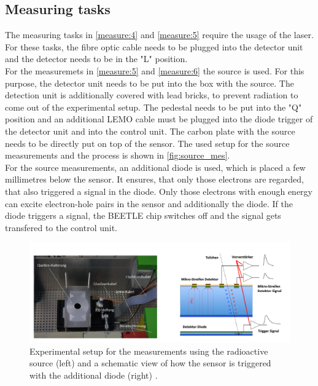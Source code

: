 \subsection{Measuring tasks}

The measuring tasks in \ref{measure:4} and \ref{measure:5} require the usage of the laser. For these tasks, the fibre optic cable
needs to be plugged into the detector unit and the detector needs to be in the "L" position.\\
For the measuremets in \ref{measure:5} and \ref{measure:6} the source is used. For this purpose, the detector unit needs
to be put into the box with the source. The detection unit is additionally covered with lead bricks, to prevent radiation to come 
out of the experimental setup. %
The pedestal needs to be put into the "Q" position and an additional LEMO cable must be plugged into
the diode trigger of the detector unit and into the control unit. The carbon plate with the source needs to be directly put on top
of the sensor. The used setup for the source measurements and the process is shown in \autoref{fig:source_mes}. \\
For the 
source measurements, an additional diode is used, which is placed a few millimetres below the sensor. It ensures, that only
those electrons are regarded, that also triggered a signal in the diode. Only those electrons with enough energy can excite
electron-hole pairs in the sensor and additionally the diode. If the diode triggers a signal, the BEETLE chip switches off
and the signal gets transfered to the control unit.
\begin{figure}
    \centering
    \includegraphics[width = .8\textwidth]{content/pics/Silicon_Sensor_SOURCE.png}
    \caption{Experimental setup for the measurements using the radioactive source (left) and a schematic view of how the sensor
    is triggered with the additional diode (right) \cite{SiliconStrip}.}
    \label{fig:source_mes}
\end{figure}\\

